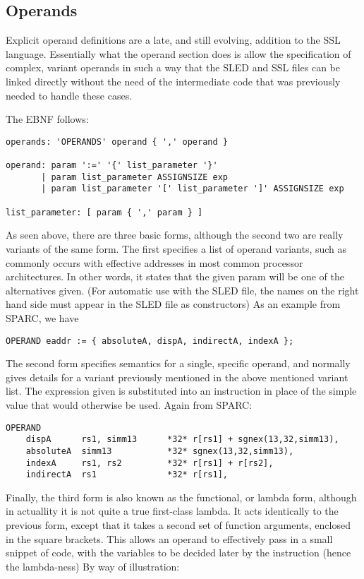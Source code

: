 \subsection{Operands}
\label{sec-operands}
Explicit operand definitions are a late, and still evolving, addition
to the SSL language. Essentially what the operand section does is allow
the specification of complex, variant operands in such a way that the
SLED and SSL files can be linked directly without the need of the intermediate
code that was previously needed to handle these cases.

The EBNF follows:
{\small
\begin{verbatim}
operands: 'OPERANDS' operand { ',' operand }

operand: param ':=' '{' list_parameter '}'
       | param list_parameter ASSIGNSIZE exp
       | param list_parameter '[' list_parameter ']' ASSIGNSIZE exp

list_parameter: [ param { ',' param } ]
\end{verbatim}
}

As seen above, there are three basic forms, although the second two are really
variants of the same form. The first specifies a list of operand variants, such
as commonly occurs with effective addresses in most common processor 
architectures. In other words, it states that the given param will be one of the
alternatives given. (For automatic use with the SLED file, the names on the
right hand side must appear in the SLED file as constructors) As an example from
SPARC, we have

{\small
\begin{verbatim}
OPERAND eaddr := { absoluteA, dispA, indirectA, indexA };
\end{verbatim} }

The second form specifies semantics for a single, specific operand, and normally
gives details for a variant previously mentioned in the above mentioned variant
list. The expression given is substituted into an instruction in place of the
simple value that would otherwise be used. Again from SPARC:

{\small
\begin{verbatim}
OPERAND
    dispA      rs1, simm13      *32* r[rs1] + sgnex(13,32,simm13),
    absoluteA  simm13           *32* sgnex(13,32,simm13),
    indexA     rs1, rs2         *32* r[rs1] + r[rs2],
    indirectA  rs1              *32* r[rs1],
\end{verbatim} }

Finally, the third form is also known as the functional, or lambda form, 
although in actuallity it is not quite a true first-class lambda. It
acts identically to the previous form, except that it takes a second set of
function arguments, enclosed in the square brackets. This allows an operand
to effectively pass in a small snippet of code, with the variables to be decided
later by the instruction (hence the lambda-ness) By way of illustration:

